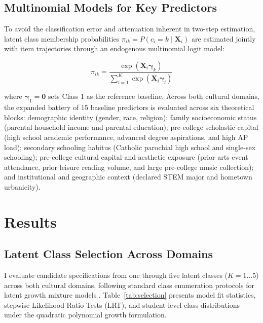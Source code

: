 \documentclass[12pt]{article}
\begin{document}
\subsection{Multinomial Models for Key Predictors}

To avoid the classification error and attenuation inherent in two-step estimation, latent class membership probabilities $\pi_{ik} = P(c_i = k \mid \mathbf{X}_i)$ are estimated jointly with item trajectories through an endogenous multinomial logit model:

\begin{equation}
\pi_{ik} = \frac{\exp(\mathbf{X}_i \boldsymbol{\gamma}_k)}{\sum_{l=1}^K \exp(\mathbf{X}_i \boldsymbol{\gamma}_l)}
\end{equation}

where $\boldsymbol{\gamma}_1 = \mathbf{0}$ sets Class 1 as the reference baseline. Across both cultural domains, the expanded battery of 15 baseline predictors is evaluated across six theoretical blocks: demographic identity (gender, race, religion); family socioeconomic status (parental household income and parental education); pre-college scholastic capital (high school academic performance, advanced degree aspirations, and high AP load); secondary schooling habitus (Catholic parochial high school and single-sex schooling); pre-college cultural capital and aesthetic exposure (prior arts event attendance, prior leisure reading volume, and large pre-college music collection); and institutional and geographic context (declared STEM major and hometown urbanicity).

\section{Results}

\subsection{Latent Class Selection Across Domains}\label{sec:selection}

I evaluate candidate specifications from one through five latent classes ($K = 1 \dots 5$) across both cultural domains, following standard class enumeration protocols for latent growth mixture models \citep{nylund2007deciding}. Table~\ref{tab:selection} presents model fit statistics, stepwise Likelihood Ratio Tests (LRT), and student-level class distributions under the quadratic polynomial growth formulation.
\end{document}
